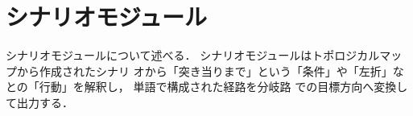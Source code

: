 \section{シナリオモジュール}
シナリオモジュールについて述べる．
シナリオモジュールはトポロジカルマップから作成されたシナリ
オから「突き当りまで」という「条件」や「左折」なとの「行動」を解釈し，
単語で構成された経路を分岐路 での目標方向へ変換して出力する．